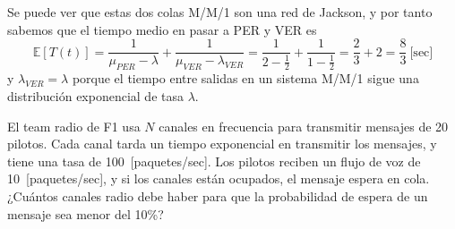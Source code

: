 \documentclass{upmassignment}
\begin{document}
\begin{problemlist}
\begin{solucion}
\begin{minipage}{\textwidth}
\end{minipage}
\vspace{1em}

Se puede ver que estas dos colas M/M/1
son una red de Jackson, y por tanto sabemos
que el tiempo medio en pasar a PER y VER es
\begin{equation*}
    \mathbb{E}[T(t)]=
    \frac{1}{\mu_{PER}-\lambda}
    +\frac{1}{\mu_{VER}-\lambda_{VER}}
    = \frac{1}{2-\frac{1}{2}}
    + \frac{1}{1-\frac{1}{2}}
    =\frac{2}{3}+2 = \frac{8}{3}~\text{[sec]}
\end{equation*}
y $\lambda_{VER}=\lambda$ porque el tiempo
entre salidas en un sistema M/M/1 sigue una
distribución exponencial de tasa $\lambda$.




    \end{solucion}


    \pbitem El team radio de F1
    usa $N$ canales en frecuencia para
    transmitir mensajes de 20 pilotos.
    Cada canal tarda un tiempo exponencial
    en transmitir los mensajes, y tiene
    una tasa de 100~[paquetes/sec].
    Los pilotos reciben un flujo de voz de
    10~[paquetes/sec], y si los canales 
    están ocupados, el mensaje espera en cola.
    ¿Cuántos canales radio debe haber para
    que la probabilidad de espera de un
    mensaje sea menor del 10\%?


\end{problemlist}
\end{document}
